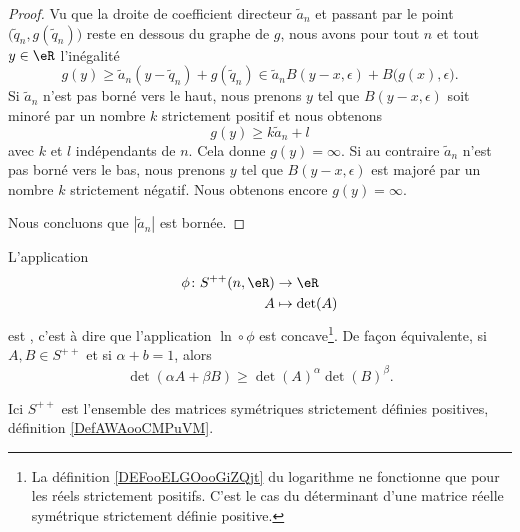 \begin{proof}
    Vu que la droite de coefficient directeur \( \tilde a_n\) et passant par le point \( \big( \tilde q_n,g(\tilde q_n) \big)\) reste en dessous du graphe de \( g\), nous avons pour tout \( n\) et tout \( y\in \eR\) l'inégalité
    \begin{equation}
        g(y)\geq \tilde a_n(y-\tilde q_n)+g(\tilde q_n)\in \tilde a_nB(y-x,\epsilon)+B\big( g(x),\epsilon \big).
    \end{equation}
    Si \( \tilde a_n\) n'est pas borné vers le haut, nous prenons \( y\) tel que \( B(y-x,\epsilon)\) soit minoré par un nombre \( k\) strictement positif et nous obtenons
    \begin{equation}
        g(y)\geq k\tilde a_n+l
    \end{equation}
    avec \( k\) et \( l\) indépendants de \( n\). Cela donne \( g(y)=\infty\). Si au contraire \( \tilde a_n\) n'est pas borné vers le bas, nous prenons $y$ tel que \( B(y-x,\epsilon)\) est majoré par un nombre \( k\) strictement négatif. Nous obtenons encore \( g(y)=\infty\).

    Nous concluons que \( | \tilde a_n |\) est bornée.
\end{proof}

\begin{lemma}   \label{LemXOUooQsigHs}
    L'application
    \begin{equation}
        \begin{aligned}
            \phi\colon S^{++}(n,\eR)&\to \eR \\
            A&\mapsto \det(A) 
        \end{aligned}
    \end{equation}
    est , c'est à dire que l'application \( \ln\circ\phi\) est concave\footnote{La définition \ref{DEFooELGOooGiZQjt} du logarithme ne fonctionne que pour les réels strictement positifs. C'est le cas du déterminant d'une matrice réelle symétrique strictement définie positive.}. De façon équivalente, si \( A,B\in S^{++}\) et si \( \alpha+b=1\), alors
    \begin{equation}    \label{EqSPKooHFZvmB}
        \det(\alpha A+\beta B)\geq \det(A)^{\alpha}\det(B)^{\beta}.
    \end{equation}
\end{lemma}
Ici \( S^{++}\) est l'ensemble des matrices symétriques strictement définies positives, définition \ref{DefAWAooCMPuVM}.

